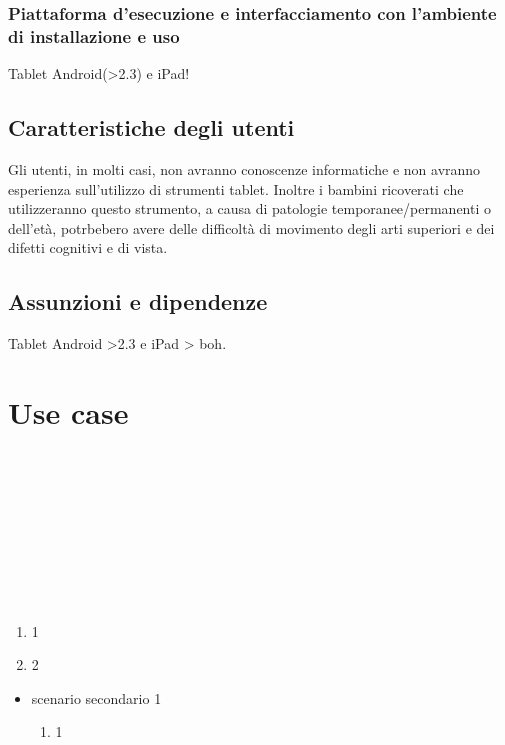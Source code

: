 \subsection{Piattaforma d'esecuzione e interfacciamento con l'ambiente di
installazione e uso}
Tablet Android(>2.3) e iPad!

\section{Caratteristiche degli utenti}
Gli utenti, in molti casi, non avranno conoscenze informatiche e non avranno
esperienza sull'utilizzo di strumenti tablet. Inoltre i bambini ricoverati che
utilizzeranno questo strumento, a causa di patologie temporanee/permanenti o
dell'età, potrbebero avere delle difficoltà di movimento degli arti superiori e
dei difetti cognitivi e di vista.

\section{Assunzioni e dipendenze}
Tablet Android >2.3 e iPad > boh.

\chapter{Use case}
\thispagestyle{fancy}


\vspace*{0.5cm}
 \\\\
 \\\\ 
 \\\\
 \\\\
\begin{enumerate}
  \item 1
  \item 2
\end{enumerate}
\begin{itemize}
  \item scenario secondario 1
  \begin {enumerate}
    \item 1
  \end{enumerate}
\end{itemize}
\newpage


